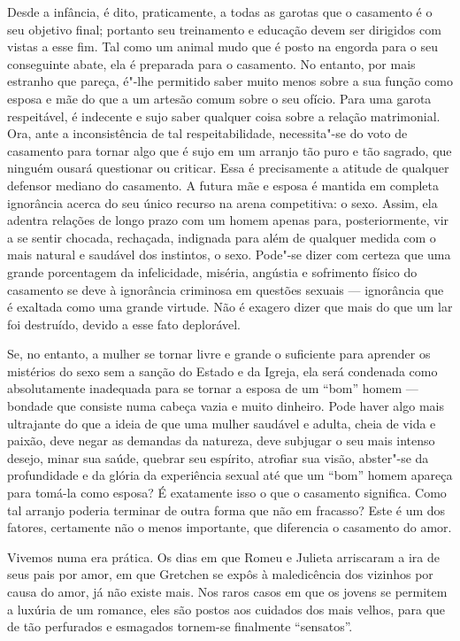 Desde a infância, é dito, praticamente, a todas as garotas que o
casamento é o seu objetivo final; portanto seu treinamento e educação
devem ser dirigidos com vistas a esse fim. Tal como um animal mudo que é
posto na engorda para o seu conseguinte abate, ela é preparada para o
casamento. No entanto, por mais estranho que pareça, é"-lhe permitido
saber muito menos sobre a sua função como esposa e mãe do que a um
artesão comum sobre o seu ofício. Para uma garota respeitável, é\label{artesao}
indecente e sujo saber qualquer coisa sobre a relação matrimonial. Ora,
ante a inconsistência de tal respeitabilidade, necessita"-se do voto
de casamento para tornar algo que é sujo em um arranjo tão puro e tão
sagrado, que ninguém ousará questionar ou criticar.
Essa é precisamente a atitude de qualquer defensor mediano do
casamento. A futura mãe e esposa é mantida em completa ignorância acerca do seu
único recurso na arena competitiva: o sexo. Assim, ela adentra relações
de longo prazo com um homem apenas para, posteriormente, vir a se sentir
chocada, rechaçada, indignada para além de qualquer medida com o mais
natural e saudável dos instintos, o sexo. Pode"-se dizer com certeza que
uma grande porcentagem da infelicidade, miséria, angústia e sofrimento
físico do casamento se deve à ignorância criminosa em questões sexuais
--- ignorância que é exaltada como uma grande virtude. Não é exagero
dizer que mais do que um lar foi destruído, devido a esse fato
deplorável.

Se, no entanto, a mulher se tornar livre e grande o suficiente para
aprender os mistérios do sexo sem a sanção do Estado e da Igreja, ela
será condenada como absolutamente inadequada para se tornar a esposa de
um ``bom'' homem --- bondade que consiste numa cabeça vazia e muito
dinheiro. Pode haver algo mais ultrajante do que a ideia de que uma
mulher saudável e adulta, cheia de vida e paixão, deve negar as demandas
da natureza, deve subjugar o seu mais intenso desejo, minar sua saúde,
quebrar seu espírito, atrofiar sua visão, abster"-se da profundidade
e da glória da experiência sexual até que um ``bom'' homem apareça
para tomá-la como esposa? É exatamente isso o que o casamento significa.
Como tal arranjo poderia terminar de outra forma que não em fracasso?
Este é um dos fatores, certamente não o menos importante, que
diferencia o casamento do amor.

Vivemos numa era prática. Os dias em que Romeu e Julieta arriscaram a
ira de seus pais por amor, em que Gretchen se expôs à maledicência dos
vizinhos por causa do amor, já não existe mais. Nos raros casos em que
os jovens se permitem a luxúria de um romance, eles são postos aos cuidados dos mais velhos, para que de tão perfurados e esmagados tornem-se finalmente ``sensatos''.

